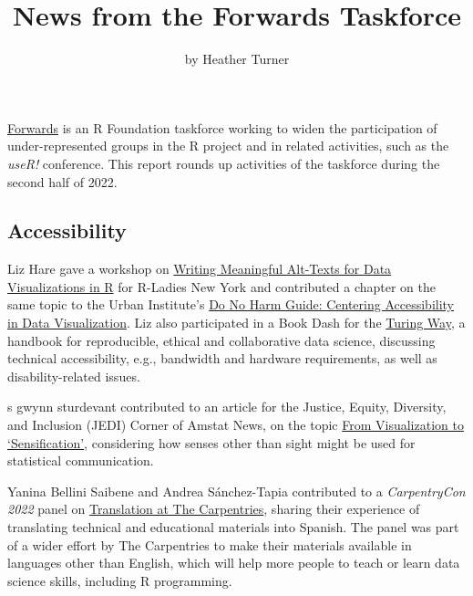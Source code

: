 \title{News from the Forwards Taskforce}
\author{by Heather Turner}

\maketitle


\href{https://forwards.github.io/}{Forwards} is an R Foundation taskforce working to widen the participation of under-represented groups in the R project and in related activities, such as the \emph{useR!} conference. This report rounds up activities of the taskforce during the second half of 2022.

\hypertarget{accessibility}{%
\subsection{Accessibility}\label{accessibility}}

Liz Hare gave a workshop on \href{https://LizHareDogs.github.io/RLadiesNYAltText}{Writing Meaningful Alt-Texts for Data Visualizations in R} for R-Ladies New York and contributed a chapter on the same topic to the Urban Institute's \href{https://www.urban.org/research/publication/do-no-harm-guide-centering-accessibility-data-visualization}{Do No Harm Guide: Centering Accessibility in Data Visualization}. Liz also participated in a Book Dash for the \href{https://the-turing-way.netlify.app/welcome.html}{Turing Way}, a handbook for reproducible, ethical and collaborative data science, discussing technical accessibility, e.g., bandwidth and hardware requirements, as well as disability-related issues.

s gwynn sturdevant contributed to an article for the Justice, Equity, Diversity, and Inclusion (JEDI) Corner of Amstat News, on the topic \href{https://magazine.amstat.org/blog/2023/01/02/jedi-corner-sensification/}{From Visualization to `Sensification'}, considering how senses other than sight might be used for statistical communication.

Yanina Bellini Saibene and Andrea Sánchez-Tapia contributed to a \emph{CarpentryCon 2022} panel on \href{https://www.youtube.com/watch?v=9zCrGda6p7Q\&t=1680s}{Translation at The Carpentries}, sharing their experience of translating technical and educational materials into Spanish. The panel was part of a wider effort by The Carpentries to make their materials available in languages other than English, which will help more people to teach or learn data science skills, including R programming.

